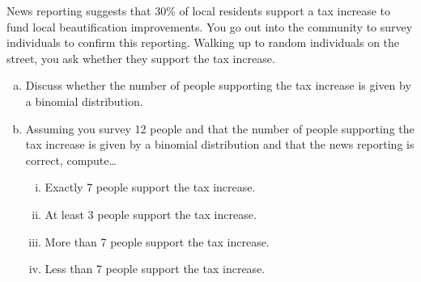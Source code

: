 \documentclass[11pt,letterpaper]{article}
\begin{document}

 News reporting suggests that 30\% of local residents support a tax increase to fund local beautification improvements. You go out into the community to survey individuals to confirm this reporting. Walking up to random individuals on the street, you ask whether they support the tax increase. 
	\begin{enumerate}[(a)]
	\item Discuss whether the number of people supporting the tax increase is given by a binomial distribution. 
	\item Assuming you survey 12 people and that the number of people supporting the tax increase is given by a binomial distribution and that the news reporting is correct, compute\dots
		\begin{enumerate}[(i)]
		\item Exactly 7 people support the tax increase.
		\item At least 3 people support the tax increase. 
		\item More than 7 people support the tax increase. 
		\item Less than 7 people support the tax increase.
		\end{enumerate}
	\end{enumerate} \pspace
\end{document}
